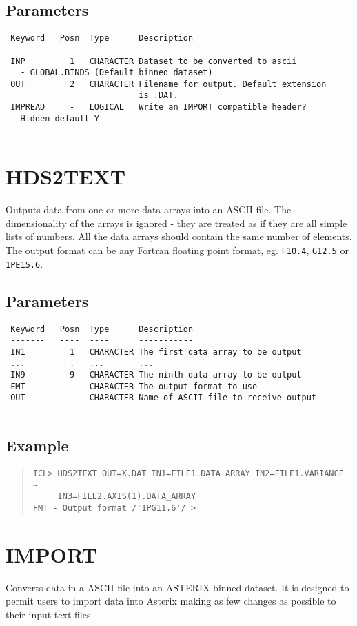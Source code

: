 \documentclass{book}
\renewcommand{\_}{{\tt\char'137}}     %
\begin{document}
\subsection{Parameters}
\begin{verbatim}
 Keyword   Posn  Type      Description
 -------   ----  ----      -----------
 INP         1   CHARACTER Dataset to be converted to ascii
   - GLOBAL.BINDS (Default binned dataset)
 OUT         2   CHARACTER Filename for output. Default extension
                           is .DAT.
 IMPREAD     -   LOGICAL   Write an IMPORT compatible header?
   Hidden default Y
 
\end{verbatim}\section{HDS2TEXT}
Outputs data from one or more data arrays into an ASCII file. The
dimensionality of the arrays is ignored - they are treated as if
they are all simple lists of numbers. All the data arrays should
contain the same number of elements.
The output format can be any Fortran floating point format, eg.
{\tt F10.4}, {\tt G12.5} or {\tt 1PE15.6}.
 
\subsection{Parameters}
\begin{verbatim}
 Keyword   Posn  Type      Description
 -------   ----  ----      -----------
 IN1         1   CHARACTER The first data array to be output
 ...         .   ...       ...
 IN9         9   CHARACTER The ninth data array to be output
 FMT         -   CHARACTER The output format to use
 OUT         -   CHARACTER Name of ASCII file to receive output
 
\end{verbatim}\subsection{Example}
\begin{quote}\begin{verbatim}
ICL> HDS2TEXT OUT=X.DAT IN1=FILE1.DATA_ARRAY IN2=FILE1.VARIANCE ~
     IN3=FILE2.AXIS(1).DATA_ARRAY
FMT - Output format /'1PG11.6'/ >
\end{verbatim}\end{quote}
\section{IMPORT}
Converts data in a ASCII file into an ASTERIX binned dataset. It
is designed to permit users to import data into Asterix making as
few changes as possible to their input text files.
 
\end{document}
